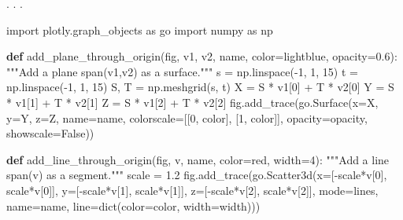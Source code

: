 \documentclass[
  letterpaper,
  DIV=11,
  numbers=noendperiod]{scrartcl}
\newenvironment{Shaded}{\begin{snugshade}}{\end{snugshade}}
\newcommand{\BuiltInTok}[1]{\textcolor[rgb]{0.00,0.23,0.31}{#1}}
\newcommand{\CommentTok}[1]{\textcolor[rgb]{0.37,0.37,0.37}{#1}}
\newcommand{\DecValTok}[1]{\textcolor[rgb]{0.68,0.00,0.00}{#1}}
\newcommand{\FloatTok}[1]{\textcolor[rgb]{0.68,0.00,0.00}{#1}}
\newcommand{\ImportTok}[1]{\textcolor[rgb]{0.00,0.46,0.62}{#1}}
\newcommand{\KeywordTok}[1]{\textcolor[rgb]{0.00,0.23,0.31}{\textbf{#1}}}
\newcommand{\NormalTok}[1]{\textcolor[rgb]{0.00,0.23,0.31}{#1}}
\newcommand{\OperatorTok}[1]{\textcolor[rgb]{0.37,0.37,0.37}{#1}}
\newcommand{\StringTok}[1]{\textcolor[rgb]{0.13,0.47,0.30}{#1}}
\newcommand{\VariableTok}[1]{\textcolor[rgb]{0.07,0.07,0.07}{#1}}
\begin{document}
. . .

\begin{Shaded}
\begin{Highlighting}[]
\ImportTok{import}\NormalTok{ plotly.graph\_objects }\ImportTok{as}\NormalTok{ go}
\ImportTok{import}\NormalTok{ numpy }\ImportTok{as}\NormalTok{ np}

\KeywordTok{def}\NormalTok{ add\_plane\_through\_origin(fig, v1, v2, name, color}\OperatorTok{=}\StringTok{\textquotesingle{}lightblue\textquotesingle{}}\NormalTok{, opacity}\OperatorTok{=}\FloatTok{0.6}\NormalTok{):}
    \CommentTok{"""Add a plane span(v1,v2) as a surface."""}
\NormalTok{    s }\OperatorTok{=}\NormalTok{ np.linspace(}\OperatorTok{{-}}\DecValTok{1}\NormalTok{, }\DecValTok{1}\NormalTok{, }\DecValTok{15}\NormalTok{)}
\NormalTok{    t }\OperatorTok{=}\NormalTok{ np.linspace(}\OperatorTok{{-}}\DecValTok{1}\NormalTok{, }\DecValTok{1}\NormalTok{, }\DecValTok{15}\NormalTok{)}
\NormalTok{    S, T }\OperatorTok{=}\NormalTok{ np.meshgrid(s, t)}
\NormalTok{    X }\OperatorTok{=}\NormalTok{ S }\OperatorTok{*}\NormalTok{ v1[}\DecValTok{0}\NormalTok{] }\OperatorTok{+}\NormalTok{ T }\OperatorTok{*}\NormalTok{ v2[}\DecValTok{0}\NormalTok{]}
\NormalTok{    Y }\OperatorTok{=}\NormalTok{ S }\OperatorTok{*}\NormalTok{ v1[}\DecValTok{1}\NormalTok{] }\OperatorTok{+}\NormalTok{ T }\OperatorTok{*}\NormalTok{ v2[}\DecValTok{1}\NormalTok{]}
\NormalTok{    Z }\OperatorTok{=}\NormalTok{ S }\OperatorTok{*}\NormalTok{ v1[}\DecValTok{2}\NormalTok{] }\OperatorTok{+}\NormalTok{ T }\OperatorTok{*}\NormalTok{ v2[}\DecValTok{2}\NormalTok{]}
\NormalTok{    fig.add\_trace(go.Surface(x}\OperatorTok{=}\NormalTok{X, y}\OperatorTok{=}\NormalTok{Y, z}\OperatorTok{=}\NormalTok{Z, name}\OperatorTok{=}\NormalTok{name, colorscale}\OperatorTok{=}\NormalTok{[[}\DecValTok{0}\NormalTok{, color], [}\DecValTok{1}\NormalTok{, color]], opacity}\OperatorTok{=}\NormalTok{opacity, showscale}\OperatorTok{=}\VariableTok{False}\NormalTok{))}

\KeywordTok{def}\NormalTok{ add\_line\_through\_origin(fig, v, name, color}\OperatorTok{=}\StringTok{\textquotesingle{}red\textquotesingle{}}\NormalTok{, width}\OperatorTok{=}\DecValTok{4}\NormalTok{):}
    \CommentTok{"""Add a line span(v) as a segment."""}
\NormalTok{    scale }\OperatorTok{=} \FloatTok{1.2}
\NormalTok{    fig.add\_trace(go.Scatter3d(x}\OperatorTok{=}\NormalTok{[}\OperatorTok{{-}}\NormalTok{scale}\OperatorTok{*}\NormalTok{v[}\DecValTok{0}\NormalTok{], scale}\OperatorTok{*}\NormalTok{v[}\DecValTok{0}\NormalTok{]], y}\OperatorTok{=}\NormalTok{[}\OperatorTok{{-}}\NormalTok{scale}\OperatorTok{*}\NormalTok{v[}\DecValTok{1}\NormalTok{], scale}\OperatorTok{*}\NormalTok{v[}\DecValTok{1}\NormalTok{]], z}\OperatorTok{=}\NormalTok{[}\OperatorTok{{-}}\NormalTok{scale}\OperatorTok{*}\NormalTok{v[}\DecValTok{2}\NormalTok{], scale}\OperatorTok{*}\NormalTok{v[}\DecValTok{2}\NormalTok{]],}
\NormalTok{                              mode}\OperatorTok{=}\StringTok{\textquotesingle{}lines\textquotesingle{}}\NormalTok{, name}\OperatorTok{=}\NormalTok{name, line}\OperatorTok{=}\BuiltInTok{dict}\NormalTok{(color}\OperatorTok{=}\NormalTok{color, width}\OperatorTok{=}\NormalTok{width)))}


\end{Highlighting}
\end{Shaded}
\end{document}
